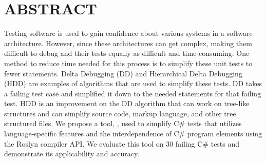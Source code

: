 
\chapter*{ABSTRACT}
\vspace{7mm}

Testing software is used to gain confidence about various systems in a software architecture. However, since these architectures can get complex, making them difficult to debug and their tests equally as difficult and time-consuming. One method to reduce time needed for this process is to simplify these unit tests to fewer statements. Delta Debugging (DD) and Hierarchical Delta Debugging (HDD) are examples of algorithms that are used to simplify these tests. DD takes a failing test case and simplified it down to the needed statements for that failing test. HDD is an improvement on the DD algorithm that can work on tree-like structures and can simplify source code, markup language, and other tree structured files. We propose a tool, \mytool, used to simplify C\# tests that utilizes language-specific features and the interdependence of C\# program elements using the Roslyn compiler API. We evaluate this tool on 30 failing C\# tests and demonstrate its applicability and accuracy.  

 